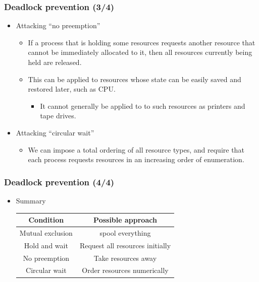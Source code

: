 \documentclass[CJKutf8,xcolor=pdftex,dvipsnames,table]{beamer}
\begin{document}
\begin{CJK*}{UTF8}{song}
  \begin{frame}
  \frametitle{Deadlock prevention (3/4)} \pause
  \begin{itemize}
  \item{Attacking ``no preemption''} \pause
    \begin{itemize}
    \item{If a process that is holding some resources requests another resource that cannot be immediately allocated to it, then all resources currently being held are released.} \pause
    \item{This can be applied to resources whose state can be easily saved and restored later, such as CPU.} \pause
      \begin{itemize}
      \item{It cannot generally be applied to to such resources as printers and tape drives.}
      \end{itemize}
    \end{itemize}
  \item{Attacking ``circular wait''} \pause
    \begin{itemize}
    \item{We can impose a total ordering of all resource types, and require that each process requests resources in an increasing order of enumeration.} \pause
    \end{itemize}
  \end{itemize}
  \end{frame}

\iffalse

  \begin{frame}
  \frametitle{Deadlock prevention (4/4)} \pause
  \begin{itemize}
  \item{Summary} \pause
    \newline
    \begin{center}
      \begin{tabular}{c|c}
        \textbf{Condition} & \textbf{Possible approach}\\
        \hline\hline \pause
        Mutual exclusion   & spool everything\\
        \hline \pause
        Hold and wait      & Request all resources initially\\
        \hline \pause
        No preemption      & Take resources away\\
        \hline \pause
        Circular wait      & Order resources numerically
      \end{tabular}
    \end{center}
  \end{itemize}
  \end{frame}


\end{CJK*}
\end{document}
